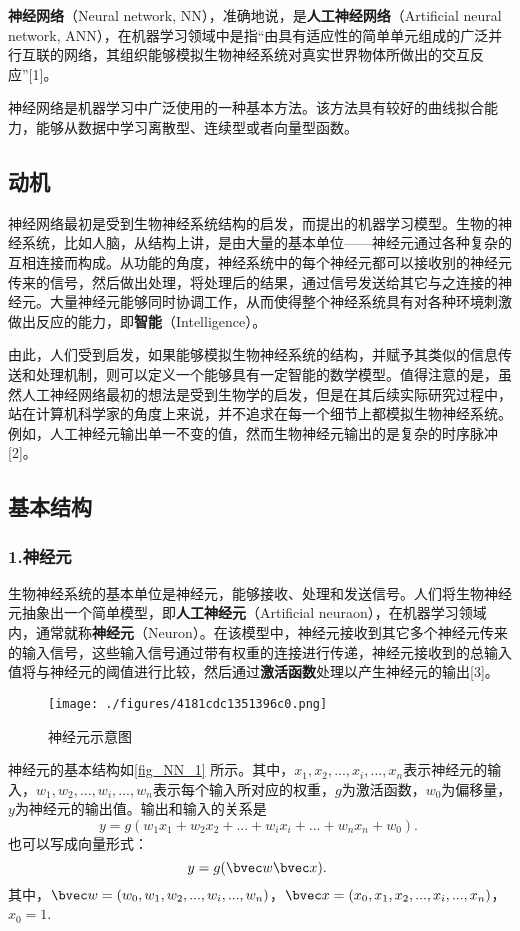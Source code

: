 
\textbf{神经网络}（Neural network, NN），准确地说，是\textbf{人工神经网络}（Artificial neural network, ANN），在机器学习领域中是指“由具有适应性的简单单元组成的广泛并行互联的网络，其组织能够模拟生物神经系统对真实世界物体所做出的交互反应”[1]。

神经网络是机器学习中广泛使用的一种基本方法。该方法具有较好的曲线拟合能力，能够从数据中学习离散型、连续型或者向量型函数。

\subsection{动机}

神经网络最初是受到生物神经系统结构的启发，而提出的机器学习模型。生物的神经系统，比如人脑，从结构上讲，是由大量的基本单位——神经元通过各种复杂的互相连接而构成。从功能的角度，神经系统中的每个神经元都可以接收别的神经元传来的信号，然后做出处理，将处理后的结果，通过信号发送给其它与之连接的神经元。大量神经元能够同时协调工作，从而使得整个神经系统具有对各种环境刺激做出反应的能力，即\textbf{智能}（Intelligence）。

由此，人们受到启发，如果能够模拟生物神经系统的结构，并赋予其类似的信息传送和处理机制，则可以定义一个能够具有一定智能的数学模型。值得注意的是，虽然人工神经网络最初的想法是受到生物学的启发，但是在其后续实际研究过程中，站在计算机科学家的角度上来说，并不追求在每一个细节上都模拟生物神经系统。例如，人工神经元输出单一不变的值，然而生物神经元输出的是复杂的时序脉冲[2]。

\subsection{基本结构}

\subsubsection{1.神经元}

生物神经系统的基本单位是神经元，能够接收、处理和发送信号。人们将生物神经元抽象出一个简单模型，即\textbf{人工神经元}（Artificial neuraon），在机器学习领域内，通常就称\textbf{神经元}（Neuron）。在该模型中，神经元接收到其它多个神经元传来的输入信号，这些输入信号通过带有权重的连接进行传递，神经元接收到的总输入值将与神经元的阈值进行比较，然后通过\textbf{激活函数}处理以产生神经元的输出[3]。
\begin{figure}[ht]
\centering
\texttt{[image: ./figures/4181cdc1351396c0.png]}
\caption{神经元示意图} \label{fig_NN_1}
\end{figure}
神经元的基本结构如\autoref{fig_NN_1} 所示。其中，$x_1, x_2, ..., x_i, ..., x_n$表示神经元的输入，$w_1, w_2, ..., w_i, ..., w_n$表示每个输入所对应的权重，$g$为激活函数，$w_0$为偏移量，$y$为神经元的输出值。输出和输入的关系是
\begin{equation}
y=g(w_1x_1+w_2x_2+...+w_ix_i+...+w_nx_n+w_0).~
\end{equation}
也可以写成向量形式：
\begin{equation}
y=g(\bvec w \bvec x).~
\end{equation}
其中，$\bvec w=(w_0, w_1, w_2, ..., w_i, ..., w_n)$，$\bvec x=(x_0, x_1, x_2, ..., x_i, ..., x_n)$，$x_0=1$.


